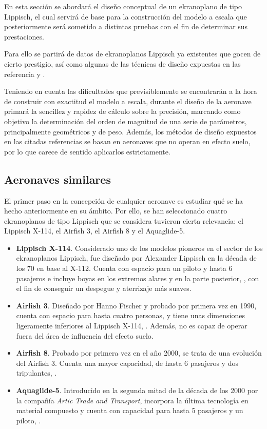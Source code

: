 En esta sección se abordará el diseño conceptual de un ekranoplano de tipo Lippisch, el cual servirá de base para la construcción del modelo a escala que posteriormente será sometido a distintas pruebas con el fin de determinar sus prestaciones.

Para ello se partirá de datos de ekranoplanos Lippisch ya existentes que gocen de cierto prestigio, así como algunas de las técnicas de diseño expuestas en las referencia \cite{ref:raymer} y \cite{ref:roskam}.

Teniendo en cuenta las dificultades que previsiblemente se encontrarán a la hora de construir con exactitud el modelo a escala, durante el diseño de la aeronave primará la sencillez y rapidez de cálculo sobre la precisión, marcando como objetivo la determinación del orden de magnitud de una serie de parámetros, principalmente geométricos y de peso. Además, los métodos de diseño expuestos en las citadas referencias se basan en aeronaves que no operan en efecto suelo, por lo que carece de sentido aplicarlos estrictamente.


\subsection{Aeronaves similares}
\label{sec:design:similar}

El primer paso en la concepción de cualquier aeronave es estudiar qué se ha hecho anteriormente en su ámbito. Por ello, se han seleccionado cuatro ekranoplanos de tipo Lippisch que se considera tuvieron cierta relevancia: el Lippisch X-114, el Airfish 3, el Airfish 8 y el Aquaglide-5.

\begin{itemize}
\item \textbf{Lippisch X-114}. Considerado uno de los modelos pioneros en el sector de los ekranoplanos Lippisch, fue diseñado por Alexander Lippisch en la década de los 70 en base al X-112. Cuenta con espacio para un piloto y hasta 6 pasajeros e incluye boyas en los extremos alares y en la parte posterior, , con el fin de conseguir un despegue y aterrizaje más suaves.
\item \textbf{Airfish 3}. Diseñado por Hanno Fischer y probado por primera vez en 1990, cuenta con espacio para hasta cuatro personas, y tiene unas dimensiones ligeramente inferiores al Lippisch X-114, . Además, no es capaz de operar fuera del área de influencia del efecto suelo.
\item \textbf{Airfish 8}. Probado por primera vez en el año 2000, se trata de una evolución del Airfish 3. Cuenta una mayor capacidad, de hasta 6 pasajeros y dos tripulantes, .
\item \textbf{Aquaglide-5}. Introducido en la segunda mitad de la década de los 2000 por la compañía \emph{Artic Trade and Transport}, incorpora la última tecnología en material compuesto y cuenta con capacidad para hasta 5 pasajeros y un piloto, .
\end{itemize}

